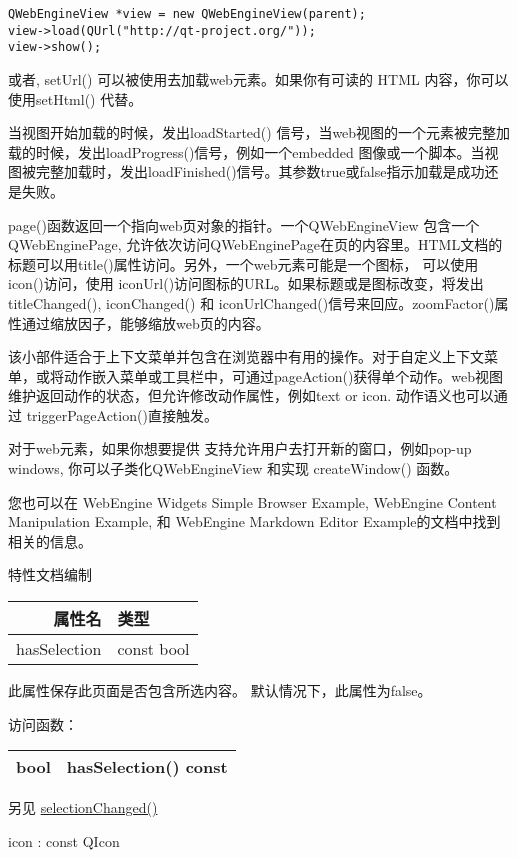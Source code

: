 \begin{lstlisting}
QWebEngineView *view = new QWebEngineView(parent);
view->load(QUrl("http://qt-project.org/"));
view->show();
\end{lstlisting}

或者, setUrl() 可以被使用去加载web元素。如果你有可读的 HTML 内容，你可以使用setHtml() 代替。

当视图开始加载的时候，发出loadStarted() 信号，当web视图的一个元素被完整加载的时候，发出loadProgress()信号，例如一个embedded 图像或一个脚本。当视图被完整加载时，发出loadFinished()信号。其参数true或false指示加载是成功还是失败。

page()函数返回一个指向web页对象的指针。一个QWebEngineView 包含一个QWebEnginePage, 允许依次访问QWebEnginePage在页的内容里。HTML文档的标题可以用title()属性访问。另外，一个web元素可能是一个图标， 可以使用icon()访问，使用 iconUrl()访问图标的URL。如果标题或是图标改变，将发出titleChanged(), iconChanged() 和 iconUrlChanged()信号来回应。zoomFactor()属性通过缩放因子，能够缩放web页的内容。

该小部件适合于上下文菜单并包含在浏览器中有用的操作。对于自定义上下文菜单，或将动作嵌入菜单或工具栏中，可通过pageAction()获得单个动作。web视图维护返回动作的状态，但允许修改动作属性，例如text or icon. 动作语义也可以通过 triggerPageAction()直接触发。

对于web元素，如果你想要提供 支持允许用户去打开新的窗口，例如pop-up windows, 你可以子类化QWebEngineView 和实现 createWindow() 函数。

您也可以在 WebEngine Widgets Simple Browser Example, WebEngine Content Manipulation Example, 和 WebEngine Markdown Editor Example的文档中找到相关的信息。

特性文档编制

\begin{tabular}{|r|l|}
	\hline
	属性名&  类型\\
	\hline
	hasSelection&	const bool\\
	\hline
\end{tabular}

此属性保存此页面是否包含所选内容。 默认情况下，此属性为false。

访问函数：

\begin{tabular}{|r|l|}
	\hline
	bool&  hasSelection() const\\
	\hline
\end{tabular}

另见 \href{https://doc.qt.io/qt-5/qwebengineview.html#selectionChanged}{selectionChanged()}

icon : const QIcon








